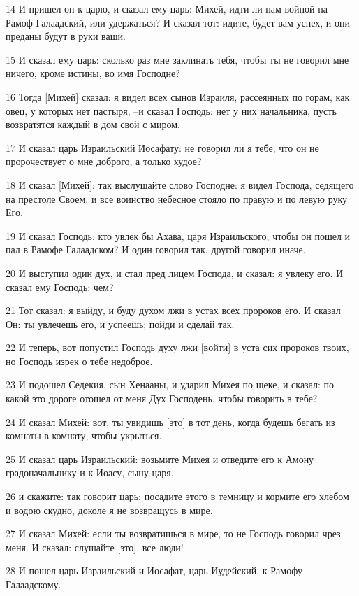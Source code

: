 \par 14 И пришел он к царю, и сказал ему царь: Михей, идти ли нам войной на Рамоф Галаадский, или удержаться? И сказал тот: идите, будет вам успех, и они преданы будут в руки ваши.
\par 15 И сказал ему царь: сколько раз мне заклинать тебя, чтобы ты не говорил мне ничего, кроме истины, во имя Господне?
\par 16 Тогда [Михей] сказал: я видел всех сынов Израиля, рассеянных по горам, как овец, у которых нет пастыря, --и сказал Господь: нет у них начальника, пусть возвратятся каждый в дом свой с миром.
\par 17 И сказал царь Израильский Иосафату: не говорил ли я тебе, что он не пророчествует о мне доброго, а только худое?
\par 18 И сказал [Михей]: так выслушайте слово Господне: я видел Господа, седящего на престоле Своем, и все воинство небесное стояло по правую и по левую руку Его.
\par 19 И сказал Господь: кто увлек бы Ахава, царя Израильского, чтобы он пошел и пал в Рамофе Галаадском? И один говорил так, другой говорил иначе.
\par 20 И выступил один дух, и стал пред лицем Господа, и сказал: я увлеку его. И сказал ему Господь: чем?
\par 21 Тот сказал: я выйду, и буду духом лжи в устах всех пророков его. И сказал Он: ты увлечешь его, и успеешь; пойди и сделай так.
\par 22 И теперь, вот попустил Господь духу лжи [войти] в уста сих пророков твоих, но Господь изрек о тебе недоброе.
\par 23 И подошел Седекия, сын Хенааны, и ударил Михея по щеке, и сказал: по какой это дороге отошел от меня Дух Господень, чтобы говорить в тебе?
\par 24 И сказал Михей: вот, ты увидишь [это] в тот день, когда будешь бегать из комнаты в комнату, чтобы укрыться.
\par 25 И сказал царь Израильский: возьмите Михея и отведите его к Амону градоначальнику и к Иоасу, сыну царя,
\par 26 и скажите: так говорит царь: посадите этого в темницу и кормите его хлебом и водою скудно, доколе я не возвращусь в мире.
\par 27 И сказал Михей: если ты возвратишься в мире, то не Господь говорил чрез меня. И сказал: слушайте [это], все люди!
\par 28 И пошел царь Израильский и Иосафат, царь Иудейский, к Рамофу Галаадскому.
